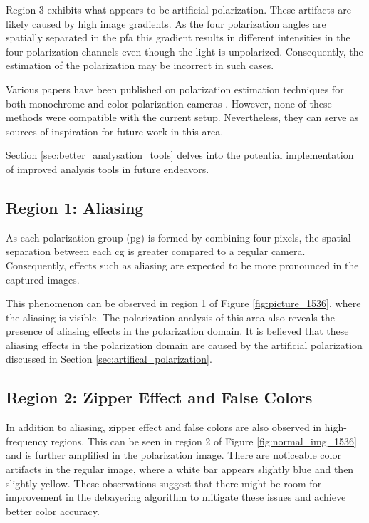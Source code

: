 Region 3 exhibits what appears to be artificial polarization.
These artifacts are likely caused by high image gradients.
As the four polarization angles are spatially separated in the \gls{pfa} this gradient results in different intensities in the four polarization channels even though the light is unpolarized.
Consequently, the estimation of the polarization may be incorrect in such cases.

Various papers have been published on polarization estimation techniques for both monochrome and color polarization cameras \cite{mihoubiSurveyDemosaickingMethods2018} \cite{spoteJointDemosaicingColour2021}.
However, none of these methods were compatible with the current setup.
Nevertheless, they can serve as sources of inspiration for future work in this area.

Section \ref{sec:better_analysation_tools} delves into the potential implementation of improved analysis tools in future endeavors.

\subsection{Region 1: Aliasing}
As each polarization group (\gls{pg}) is formed by combining four pixels, the spatial separation between each \gls{cg} is greater compared to a regular camera.
Consequently, effects such as aliasing are expected to be more pronounced in the captured images.

This phenomenon can be observed in region 1 of Figure \ref{fig:picture_1536}, where the aliasing is visible.
The polarization analysis of this area also reveals the presence of aliasing effects in the polarization domain.
It is believed that these aliasing effects in the polarization domain are caused by the artificial polarization discussed in Section \ref{sec:artifical_polarization}.


\subsection{Region 2: Zipper Effect and False Colors}

In addition to aliasing, zipper effect and false colors are also observed in high-frequency regions.
This can be seen in region 2 of Figure \ref{fig:normal_img_1536} and is further amplified in the polarization image.
There are noticeable color artifacts in the regular image, where a white bar appears slightly blue and then slightly yellow.
These observations suggest that there might be room for improvement in the debayering algorithm to mitigate these issues and achieve better color accuracy.

